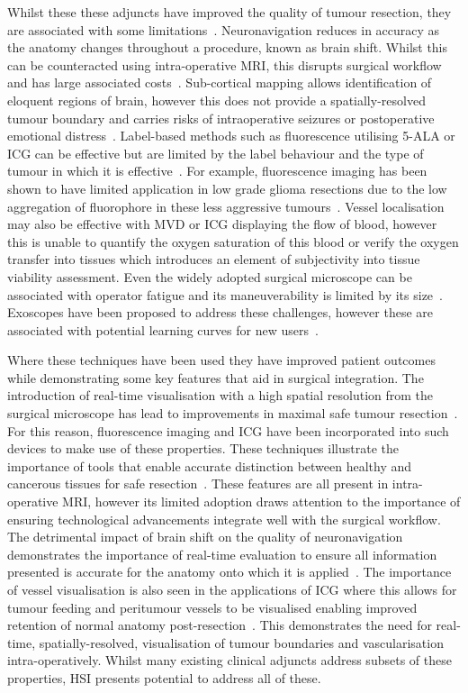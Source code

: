 Whilst these these adjuncts have improved the quality of tumour resection, they are associated with some limitations~\cite{Chanbour2022}. Neuronavigation reduces in accuracy as the anatomy changes throughout a procedure, known as brain shift. Whilst this can be counteracted using intra-operative MRI, this disrupts surgical workflow and has large associated costs~\cite{Chanbour2022}. Sub-cortical mapping allows identification of eloquent regions of brain, however this does not provide a spatially-resolved tumour boundary and carries risks of intraoperative seizures or postoperative emotional distress~\cite{Chanbour2022}. Label-based methods such as fluorescence utilising 5-ALA or ICG can be effective but are limited by the label behaviour and the type of tumour in which it is effective~\cite{Chanbour2022}. For example, fluorescence imaging has been shown to have limited application in low grade glioma resections due to the low aggregation of fluorophore in these less aggressive tumours~\cite{Belykh2023, Kiesel2021, Jaber2019}. Vessel localisation may also be effective with MVD or ICG displaying the flow of blood, however this is unable to quantify the oxygen saturation of this blood or verify the oxygen transfer into tissues which introduces an element of subjectivity into tissue viability assessment. Even the widely adopted surgical microscope can be associated with operator fatigue and its maneuverability is limited by its size~\cite{Alamer2023}. Exoscopes have been proposed to address these challenges, however these are associated with potential learning curves for new users~\cite{Alamer2023}.

Where these techniques have been used they have improved patient outcomes while demonstrating some key features that aid in surgical integration. The introduction of real-time visualisation with a high spatial resolution from the surgical microscope has lead to improvements in maximal safe tumour resection~\cite{Alamer2023}. For this reason, fluorescence imaging and ICG have been incorporated into such devices to make use of these properties. These techniques illustrate the importance of tools that enable accurate distinction between healthy and cancerous tissues for safe resection~\cite{Belykh2023}. These features are all present in intra-operative MRI, however its limited adoption draws attention to the importance of ensuring technological advancements integrate well with the surgical workflow. The detrimental impact of brain shift on the quality of neuronavigation demonstrates the importance of real-time evaluation to ensure all information presented is accurate for the anatomy onto which it is applied~\cite{Alamer2023}. The importance of vessel visualisation is also seen in the applications of ICG where this allows for tumour feeding and peritumour vessels to be visualised enabling improved retention of normal anatomy post-resection~\cite{Catapano2018}. This demonstrates the need for real-time, spatially-resolved, visualisation of tumour boundaries and vascularisation intra-operatively. Whilst many existing clinical adjuncts address subsets of these properties, HSI presents potential to address all of these.  

